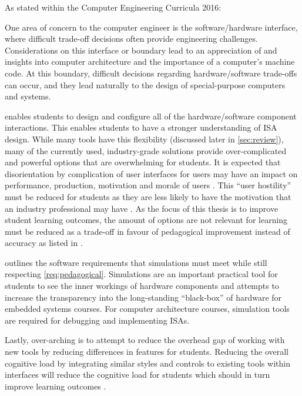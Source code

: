 As stated within the Computer Engineering Curricula 2016:
\begin{displayquote}
    One area of concern to the computer engineer is the software/hardware interface, where difficult trade-off decisions often provide engineering challenges. Considerations on this interface or boundary lead to an    appreciation of and insights into computer architecture and the importance of a computer’s machine code. At this boundary, difficult decisions regarding hardware/software trade-offs can occur, and they lead naturally to the design of special-purpose computers and systems.
\end{displayquote}
\noindent {} enables students to design and configure all of the hardware/software component interactions. This enables students to have a stronger understanding of ISA design. While many tools have this flexibility (discussed later in \cref{sec:review}), many of the currently used, industry-grade solutions provide over-complicated and powerful options that are overwhelming for students. It is expected that disorientation by complication of user interfaces for users may have an impact on performance, production, motivation and morale of users \cite{Chalmers2003}. This ``user hostility'' must be reduced for students as they are less likely to have the motivation that an industry professional may have \cite{Djordjevic2005}. As the focus of this thesis is to improve student learning outcomes, the amount of options are not relevant for learning must be reduced as a trade-off in favour of pedagogical improvement instead of accuracy as listed in . 

 outlines the software requirements that simulations must meet while still respecting \cref{req:pedagogical}. Simulations are an important practical tool for students to see the inner workings of hardware components and attempts to increase the transparency into the long-standing ``black-box'' of hardware for embedded systems courses. For computer architecture courses, simulation tools are required for debugging and implementing ISAs. 

Lastly, over-arching  is to attempt to reduce the overhead gap of working with new tools by reducing differences in features for students. Reducing the overall cognitive load by integrating similar styles and controls to existing tools within interfaces will reduce the cognitive load for students which should in turn improve learning outcomes \cite{Chalmers2003, Mavaddat1988}.

